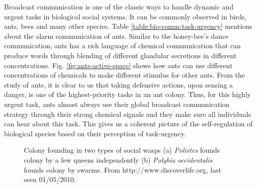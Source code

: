 Broadcast communication is one of the classic ways to handle dynamic and urgent tasks in biological social systems. It can be commonly observed in birds, ants, bees and many other species. Table \ref{table:bio-comm-task-urgency} mentions about the alarm communication of ants. Similar to the honey-bee's dance communication, ants has a rich language of chemical communication that can produce words through blending of different glandular secretions in different concentrations. Fig. \ref{fig:ants-active-space} shows how ants can use different concentrations of chemicals to make different stimulus for other ants. From the study of ants, it is clear to us that taking defensive actions, upon sensing a danger, is one of the highest-priority tasks in an ant colony. Thus, for this highly urgent task, ants almost always use their global broadcast communication strategy through their strong chemical signals and they make sure all individuals can hear about this task.  This gives us a coherent picture of the self-regulation of biological species based on their perception of task-urgency.
\begin{figure}
\centering
{}
\hspace{0.25cm}
\caption{Colony founding in two types of social wasps (a) {\em Polistes}  founds colony by a few queens independently (b) {\em Polybia occidentalis}  founds colony by swarms. From http://www.discoverlife.org, last seen 01/05/2010.}
\label{fig:social-wasps}
\end{figure}
